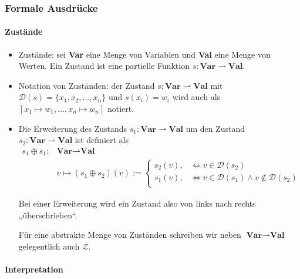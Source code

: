 \documentclass[
  a4paper,
  11pt,
]{scrartcl}
\newcommand{\Dc}{\mathcal{D}}
\newcommand{\Zc}{\mathcal{Z}}
\begin{document}
\subsubsection{Formale Ausdrücke}
\label{ssub:formale_ausdruecke}

\paragraph{Zustände}
\label{par:zustande}

\begin{itemize}
  \item Zustände: sei \textbf{Var} eine Menge von Variablen und \textbf{Val}
    eine Menge von Werten. Ein Zustand ist eine partielle Funktion $s:
    \textbf{Var} \rightharpoonup \textbf{Val}$.

  \item Notation von Zuständen: der Zustand $s: \textbf{Var} \rightharpoonup
    \textbf{Val}$ mit $\Dc(s) = \{x_1, x_2, \dots, x_n\}$ und $s(x_i) =
    w_i$ wird auch als $[x_1 \mapsto w_1, \dots, x_n \mapsto w_n]$ notiert.

  \item Die Erweiterung des Zustands $s_1: \textbf{Var} \rightharpoonup
    \textbf{Val}$ um den Zustand $s_2: \textbf{Var} \rightharpoonup
    \textbf{Val}$ ist definiert als
    \begin{align*}
      s_1 \oplus s_1: & \textbf{Var} \rightharpoonup \textbf{Val}\\
      & v \mapsto (s_1 \oplus s_2)(v) :=
        \begin{cases}
          s_2(v), & \Leftrightarrow v \in \Dc(s_2)\\
          s_1(v), & \Leftrightarrow v \in \Dc(s_1)
            \wedge v \notin \Dc(s_2)\\
        \end{cases}
    \end{align*}

    Bei einer Erweiterung wird ein Zustand also von links nach rechts
    „überschrieben“.

    Für eine abstrakte Menge von Zuständen schreiben wir neben $\textbf{Var}
    \rightharpoonup \textbf{Val}$ gelegentlich auch $\Zc$.
\end{itemize}

\paragraph{Interpretation}
\label{par:interpretation}
\end{document}
